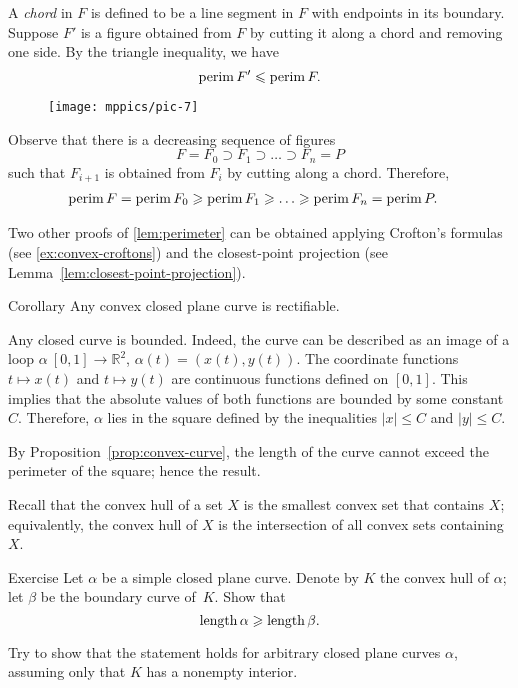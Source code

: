 A \emph{chord} in $F$ is defined to be a line segment in $F$ with endpoints in its boundary.
Suppose $F'$ is a figure obtained from $F$ by cutting it along a chord and removing one side.
By the triangle inequality, we have
\[\mathop{\rm perim}\nolimits F'\leqslant \mathop{\rm perim}\nolimits F.\]

\begin{wrapfigure}{o}{24 mm}
\vskip-10mm
\centering
\texttt{[image: mppics/pic-7]}
\vskip3mm
\end{wrapfigure}

Observe that there is a decreasing sequence of figures 
\[F=F_0\supset F_1\supset\dots\supset F_n=P\]
such that $F_{i+1}$ is obtained from $F_{i}$ by cutting along a chord.
Therefore, 
\begin{align*}
\perim F=\perim F_0&\ge\perim F_1\ge\dots\ge\perim F_n=\perim P.
\end{align*}
\qedsf

Two other proofs of \ref{lem:perimeter} can be obtained applying Crofton's formulas (see \ref{ex:convex-croftons}) and the closest-point projection (see Lemma~\ref{lem:closest-point-projection}).  

\begin{thm}{Corollary}\label{cor:convex=>rectifiable}
Any convex closed plane curve is rectifiable.  
\end{thm}

Any closed curve is bounded.
Indeed, the curve can be described as an image of a loop $\alpha\:[0,1]\to\mathbb{R}^2$, $\alpha(t)=(x(t),y(t))$.
The coordinate functions $t\mapsto x(t)$ and $t\mapsto y(t)$ are continuous functions defined on $[0,1]$.
This implies that the absolute values of both functions are bounded by some constant~$C$.
Therefore, $\alpha$ lies in the square defined by the inequalities $|x|\le C$ and $|y|\le C$.


By Proposition~\ref{prop:convex-curve}, the length of the curve cannot exceed the perimeter of the square; hence the result.
\qeds

Recall that the convex hull of a set $X$ is the smallest convex set that contains $X$; equivalently, the convex hull of $X$ is the intersection of all convex sets containing~$X$.

\begin{thm}{Exercise}\label{ex:convex-hull}
Let $\alpha$ be a simple closed plane curve.
Denote by $K$ the convex hull of $\alpha$; let $\beta$ be the boundary curve of~$K$.
Show that 
\[\mathop{\rm length}\nolimits \alpha\geqslant \mathop{\rm length}\nolimits \beta.\]

Try to show that the statement holds for arbitrary closed plane curves $\alpha$, assuming only that $K$ has a nonempty interior.
\end{thm}


